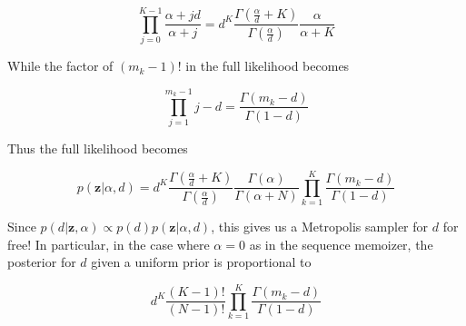 \documentclass[11pt]{article}
\begin{document}
\begin{equation}
\prod_{j=0}^{K-1} \frac{\alpha + jd}{\alpha + j} = d^K \frac{\Gamma(\frac{\alpha}{d} + K)}{\Gamma(\frac{\alpha}{d})} \frac{\alpha}{\alpha + K}
\end{equation}

While the factor of $(m_k - 1)!$ in the full likelihood becomes

\begin{equation}
\prod_{j=1}^{m_k - 1} j - d = \frac{\Gamma(m_k - d)}{\Gamma(1-d)}
\end{equation}

Thus the full likelihood becomes

\begin{equation}
p(\mathbf{z}|\alpha,d) = d^K \frac{\Gamma(\frac{\alpha}{d} + K)}{\Gamma(\frac{\alpha}{d})} \frac{\Gamma(\alpha)}{\Gamma(\alpha + N)} \prod_{k=1}^{K} \frac{\Gamma(m_k - d)}{\Gamma(1-d)}
\end{equation}

Since $p(d|\mathbf{z},\alpha) \propto p(d) p(\mathbf{z}|\alpha,d)$, this gives us a Metropolis sampler for $d$ for free!  In particular, in the case where $\alpha = 0$ as in the sequence memoizer, the posterior for $d$ given a uniform prior is proportional to

\begin{equation}
d^K \frac{(K-1)!}{(N-1)!} \prod_{k=1}^K \frac{\Gamma(m_k - d)}{\Gamma(1-d)}
\end{equation}
\end{document}
